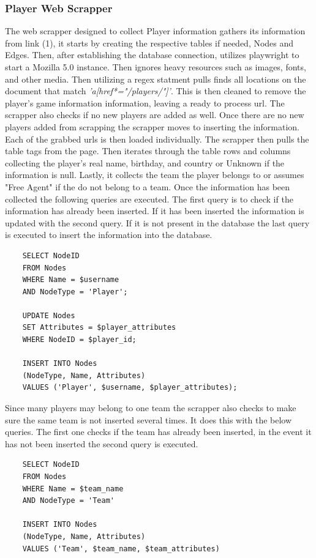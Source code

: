 \documentclass[sigconf]{acmart}
\begin{document}
\subsubsection{Player Web Scrapper}
The web scrapper designed to collect Player information gathers its information from link (1), it starts by creating the respective tables if needed, Nodes and Edges. Then, after establishing the database connection, utilizes playwright to start a Mozilla 5.0 instance. Then ignores heavy resources such as images, fonts, and other media. Then utilizing a regex statment pulls finds all locations on the document that match \textit{'a[href*="/players/"]'}. This is then cleaned to remove the player's game information information, leaving a ready to process url. The scrapper also checks if no new players are added as well. Once there are no new players added from scrapping the scrapper moves to inserting the information. Each of the grabbed urls is then loaded individually. The scrapper then pulls the table tags from the page. Then iterates through the table rows and columns collecting the player's real name, birthday, and country or Unknown if the information is null. Lastly, it collects the team the player belongs to or assumes "Free Agent" if the do not belong to a team. Once the information has been collected the following queries are executed. The first query is to check if the information has already been inserted. If it has been inserted the information is updated with the second query. If it is not present in the database the last query is executed to insert the information into the database.
\begin{verbatim}
    SELECT NodeID
    FROM Nodes
    WHERE Name = $username
    AND NodeType = 'Player';

    UPDATE Nodes
    SET Attributes = $player_attributes
    WHERE NodeID = $player_id;

    INSERT INTO Nodes
    (NodeType, Name, Attributes)
    VALUES ('Player', $username, $player_attributes);
\end{verbatim}
Since many players may belong to one team the scrapper also checks to make sure the same team is not inserted several times. It does this with the below queries. The first one checks if the team has already been inserted, in the event it has not been inserted the second query is executed.
\begin{verbatim}
    SELECT NodeID
    FROM Nodes
    WHERE Name = $team_name
    AND NodeType = 'Team'

    INSERT INTO Nodes
    (NodeType, Name, Attributes)
    VALUES ('Team', $team_name, $team_attributes)
\end{verbatim}
\end{document}
